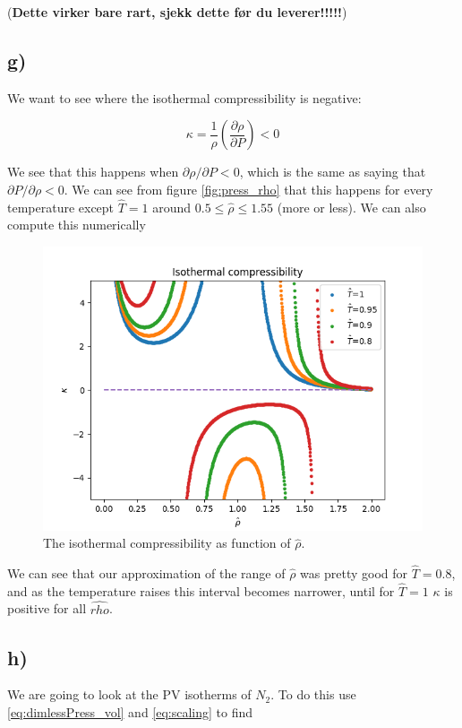\documentclass[a4paper,norsk, 10pt]{article}
\newcommand{\pd}[2]{\frac{\partial #1}{\partial #2}}
\begin{document}
 (\textbf{Dette virker bare rart, sjekk dette før du leverer!!!!!})

\subsection{g)}

We want to see where the isothermal compressibility is negative:

\begin{equation}
\kappa = \frac{1}{\rho}\left(\pd{\rho}{P}\right) < 0
\end{equation}

We see that this happens when $\partial \rho/\partial P < 0$, which is the same as saying that $\partial P/\partial \rho < 0$. We can see from figure \ref{fig:press_rho} that this happens for every temperature except $\hat{T} = 1$ around $0.5 \leq \hat{\rho} \leq 1.55$ (more or less). We can also compute this numerically

\begin{figure}[H]
\centering
\includegraphics[scale=0.5]{isoComp.png}
\caption{The isothermal compressibility as function of $\hat{\rho}$.}
\label{fig:isoComp}
\end{figure}

We can see that our approximation of the range of $\hat{\rho}$ was pretty good for $\hat{T} = 0.8$, and as the temperature raises this interval becomes narrower, until for $\hat{T} = 1$ $\kappa$ is positive for all $\hat{rho}$.


\subsection{h)}
We are going to look at the PV isotherms of $N_2$. To do this use \eqref{eq:dimlessPress_vol} and \eqref{eq:scaling} to find
\end{document}

